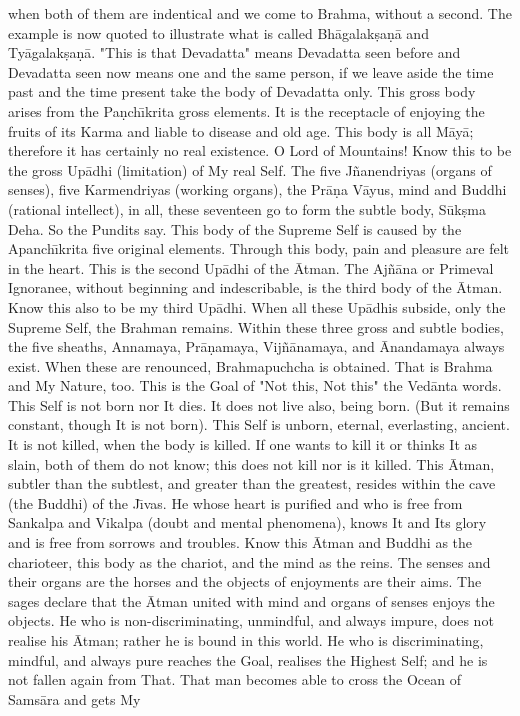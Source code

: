 when both of them are indentical and we come to Brahma, without a second. The example is now quoted to illustrate what is called Bh\=agalak\d{s}a\d{n}\=a and Ty\=agalak\d{s}a\d{n}\=a. "This is that Devadatta" means Devadatta seen before and Devadatta seen now means one and the same person, if we leave aside the time past and the time present take the body of Devadatta only. This gross body arises from the Pa\d{n}ch\={\i}krita gross elements. It is the receptacle of enjoying the fruits of its Karma and liable to disease and old age. This body is all M\=ay\=a; therefore it has certainly no real existence. O Lord of Mountains! Know this to be the gross Up\=adhi (limitation) of My real Self. The five J\~nanendriyas (organs of senses), five Karmendriyas (working organs), the Pr\=a\d{n}a V\=ayus, mind and Buddhi (rational intellect), in all, these seventeen go to form the subtle body, S\=uk\d{s}ma Deha. So the Pundits say. This body of the Supreme Self is caused by the Apanch\={\i}krita five original elements. Through this body, pain and pleasure are felt in the heart. This is the second Up\=adhi of the \=Atman. The Aj\~n\=ana or Primeval Ignoranee, without beginning and indescribable, is the third body of the \=Atman. Know this also to be my third Up\=adhi. When all these Up\=adhis subside, only the Supreme Self, the Brahman remains. Within these three gross and subtle bodies, the five sheaths, Annamaya, Pr\=a\d{n}amaya, Vij\~n\=anamaya, and \=Anandamaya always exist. When these are renounced, Brahmapuchcha is obtained. That is Brahma and My Nature, too. This is the Goal of "Not this, Not this" the Ved\=anta words. This Self is not born nor It dies. It does not live also, being born. (But it remains constant, though It is not born). This Self is unborn, eternal, everlasting, ancient. It is not killed, when the body is killed. If one wants to kill it or thinks It as slain, both of them do not know; this does not kill nor is it killed. This \=Atman, subtler than the subtlest, and greater than the greatest, resides within the cave (the Buddhi) of the J\={\i}vas. He whose heart is purified and who is free from Sankalpa and Vikalpa (doubt and mental phenomena), knows It and Its glory and is free from sorrows and troubles. Know this \=Atman and Buddhi as the charioteer, this body as the chariot, and the mind as the reins. The senses and their organs are the horses and the objects of enjoyments are their aims. The sages declare that the \=Atman united with mind and organs of senses enjoys the objects. He who is non-discriminating, unmindful, and always impure, does not realise his \=Atman; rather he is bound in this world. He who is discriminating, mindful, and always pure reaches the Goal, realises the Highest Self; and he is not fallen again from That. That man becomes able to cross the Ocean of Sams\=ara and gets My

